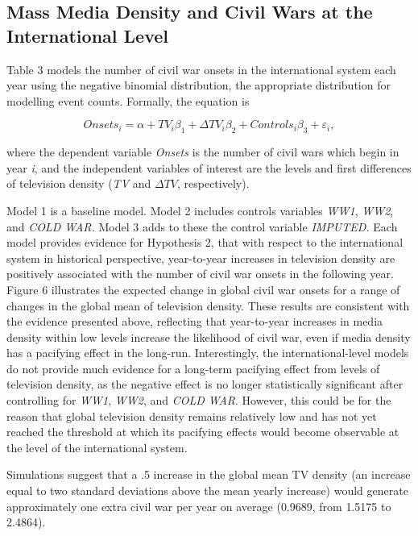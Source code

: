 \documentclass[12pt,article,oneside]{memoir}
\begin{document}
\clearpage

\subsection{Mass Media Density and Civil Wars at the International
Level}\label{mass-media-density-and-civil-wars-at-the-international-level}

Table 3 models the number of civil war onsets in the international
system each year using the negative binomial distribution, the
appropriate distribution for modelling event counts. Formally, the
equation is

\[ Onsets_{i} = \alpha + TV_{i} \beta_1 + \Delta TV_{i} \beta_2 + Controls_{i} \beta_3  + \varepsilon_{i}, \]

where the dependent variable \emph{Onsets} is the number of civil wars
which begin in year \emph{i}, and the independent variables of interest
are the levels and first differences of television density (\emph{TV}
and $\Delta TV$, respectively).

Model 1 is a baseline model. Model 2 includes controls variables
\emph{WW1}, \emph{WW2}, and \emph{COLD WAR.} Model 3 adds to these the
control variable \emph{IMPUTED.} Each model provides evidence for
Hypothesis 2, that with respect to the international system in
historical perspective, year-to-year increases in television density are
positively associated with the number of civil war onsets in the
following year. Figure 6 illustrates the expected change in global civil
war onsets for a range of changes in the global mean of television
density. These results are consistent with the evidence presented above,
reflecting that year-to-year increases in media density within low
levels increase the likelihood of civil war, even if media density has a
pacifying effect in the long-run. Interestingly, the international-level
models do not provide much evidence for a long-term pacifying effect
from levels of television density, as the negative effect is no longer
statistically significant after controlling for \emph{WW1}, \emph{WW2},
and \emph{COLD WAR}. However, this could be for the reason that global
television density remains relatively low and has not yet reached the
threshold at which its pacifying effects would become observable at the
level of the international system.

\clearpage

Simulations suggest that a .5 increase in the global mean TV density (an
increase equal to two standard deviations above the mean yearly
increase) would generate approximately one extra civil war per year on
average (0.9689, from 1.5175 to 2.4864).
\end{document}

